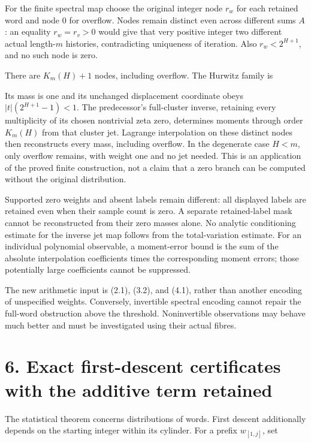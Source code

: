 For the finite spectral map choose the original integer node \(r_w\) for
each retained word and node 0 for overflow. Nodes remain distinct even
across different sums \(A\): an equality \(r_w=r_v>0\) would give that
very positive integer two different actual length-\(m\) histories,
contradicting uniqueness of iteration. Also \(r_w<2^{H+1}\), and no such
node is zero.

There are \(K_m(H)+1\) nodes, including overflow. The Hurwitz family is


Its mass is one and its unchanged displacement coordinate obeys
\(|t|(2^{H+1}-1)<1\). The predecessor's full-cluster inverse, retaining
every multiplicity of its chosen nontrivial zeta zero, determines
moments through order \(K_m(H)\) from that cluster jet. Lagrange
interpolation on these distinct nodes then reconstructs every mass,
including overflow. In the degenerate case \(H<m\), only overflow
remains, with weight one and no jet needed. This is an application of
the proved finite construction, not a claim that a zero branch can be
computed without the original distribution.

Supported zero weights and absent labels remain different: all displayed
labels are retained even when their sample count is zero. A separate
retained-label mask cannot be reconstructed from their zero masses
alone. No analytic conditioning estimate for the inverse jet map follows
from the total-variation estimate. For an individual polynomial
observable, a moment-error bound is the sum of the absolute
interpolation coefficients times the corresponding moment errors; those
potentially large coefficients cannot be suppressed.

The new arithmetic input is (2.1), (3.2), and (4.1), rather than another
encoding of unspecified weights. Conversely, invertible spectral
encoding cannot repair the full-word obstruction above the threshold.
Noninvertible observations may behave much better and must be
investigated using their actual fibres.

\section{6. Exact first-descent certificates with the additive term
retained}

The statistical theorem concerns distributions of words. First descent
additionally depends on the starting integer within its cylinder. For a
prefix \(w_{[1,j]}\), set

